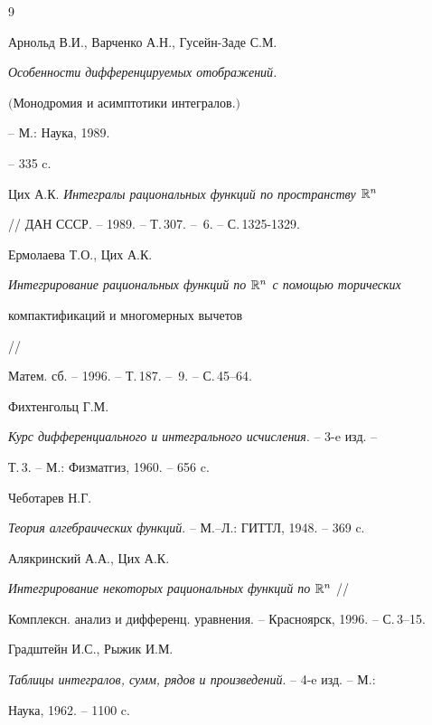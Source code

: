 \begin{thebibliography}{9}







Арнольд В.И., Варченко А.Н., Гусейн-Заде С.М.


{\em Особенности дифференцируемых отображений.


$($Монодромия и асимптотики интегралов.$)$} -- М.: Наука, 1989.


-- 335 c.







Цих А.К. {\em Интегралы рациональных функций по пространству ${\Bbb R}^n$}


// ДАН СССР. -- 1989. -- Т.\,307. -- \No\,6. -- С.\,1325-1329.







Ермолаева Т.О., Цих А.К.


{\em Интегрирование рациональных функций по ${\Bbb R}^n$ с помощью торических


компактификаций и многомерных вычетов} //


Матем. сб. -- 1996. -- Т.\,187. -- \No\,9. -- С.\,45--64.







Фихтенгольц Г.М.


{\em Курс дифференциального и интегрального исчисления}. -- 3-e изд. --


Т.\,3. -- М.: Физматгиз, 1960. -- 656 c.







Чеботарев Н.Г.


{\em Теория алгебраических функций}. -- М.--Л.: ГИТТЛ, 1948. -- 369 c.







Алякринский А.А., Цих А.К.


{\em Интегрирование некоторых рациональных функций по $\Bbb {R}^n$} //


Комплексн. анализ и дифференц. уравнения. -- Красноярск, 1996. -- С.\,3--15.







Градштейн И.С., Рыжик И.М.


{\em Таблицы интегралов, сумм, рядов и произведений}. -- 4-e изд. -- М.:


Наука, 1962. -- 1100 c.





\end{thebibliography}





